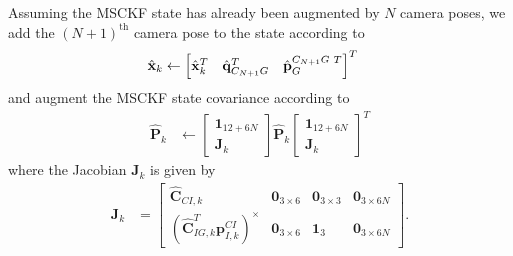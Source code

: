 \documentclass[letterpaper, 10 pt, conference]{ieeeconf}  %
\def\Vec#1{\mathbf{#1}}
\newcommand{\bbm}{\begin{bmatrix}}
\newcommand{\ebm}{\end{bmatrix}}
\begin{document}
Assuming the MSCKF state has already been augmented by $N$ camera poses, we add the $\left(N+1\right)^\text{th}$ camera pose to the state according to
\begin{align}
    \hat{\Vec{x}}_k &\leftarrow \bbm \hat{\Vec{x}}_k^T & \hat{\Vec{q}}_{C_{N+1} G}^T & \hat{\Vec{p}}_G^{C_{N+1} G \hspace{0.3em} T} \ebm^T 
\end{align}
and augment the MSCKF state covariance according to
\begin{align}
    \hat{\Vec{P}}_k &\leftarrow \bbm \Vec{1}_{12+6N} \\ \Vec{J}_k \ebm \hat{\Vec{P}}_k \bbm \Vec{1}_{12+6N} \\ \Vec{J}_k \ebm^T
\end{align}
where the Jacobian $\Vec{J}_k$ is given by
\begin{align}
\Vec{J}_k &= \bbm \hat{\Vec{C}}_{C I, k} & \Vec{0}_{3\times6} & \Vec{0}_{3\times3} & \Vec{0}_{3\times6N} \\
                            \left(\hat{\Vec{C}}_{I G, k}^T \Vec{p}_{I,k}^{CI}\right)^\times & \Vec{0}_{3\times6} & \Vec{1}_3 & \Vec{0}_{3\times6N}
                \ebm .
\end{align}
\end{document}
